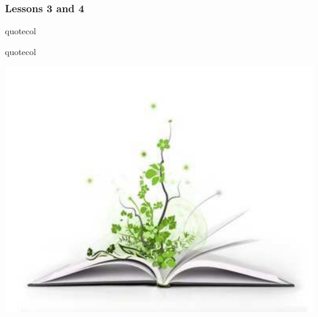 \begin{frame}
  \MadLogo
  \frametitle{Lessons 3 and 4}

\vfill
\begin{beamercolorbox}[wd=\textwidth,center]{quotecol}
\Large {}
\end{beamercolorbox}
\vfill
\begin{beamercolorbox}[wd=\textwidth,center]{quotecol}
\Large {}
\end{beamercolorbox}
\begin{center}
\includegraphics[height=0.33\textheight]{Fig/books}
\end{center}

\end{frame}

